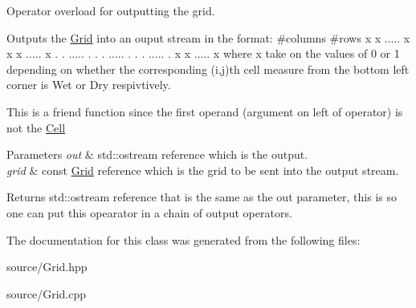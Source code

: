 Operator overload for outputting the grid. 

Outputs the \hyperlink{class_grid}{Grid} into an ouput stream in the format\+: \#columns \#rows x x ..... x x x ..... x . . ..... . . . ..... . . . ..... . x x ..... x where x take on the values of 0 or 1 depending on whether the corresponding (i,j)th cell measure from the bottom left corner is Wet or Dry respivtively.

This is a friend function since the first operand (argument on left of operator) is not the \hyperlink{class_cell}{Cell}


\begin{DoxyParams}{Parameters}
{\em out} & std\+::ostream reference which is the output. \\
\hline
{\em grid} & const \hyperlink{class_grid}{Grid} reference which is the grid to be sent into the output stream.\\
\hline
\end{DoxyParams}
\begin{DoxyReturn}{Returns}
std\+::ostream reference that is the same as the out parameter, this is so one can put this opearator in a chain of output operators. 
\end{DoxyReturn}


The documentation for this class was generated from the following files\+:\begin{DoxyCompactItemize}
\item 
source/Grid.\+hpp\item 
source/Grid.\+cpp\end{DoxyCompactItemize}
